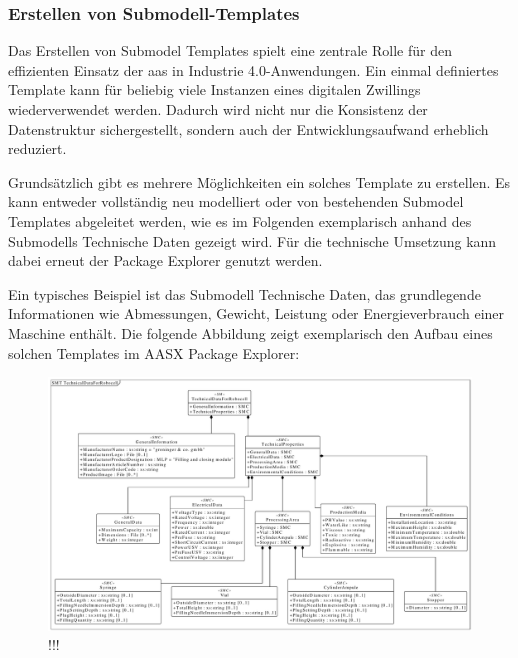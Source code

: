 \subsubsection{Erstellen von Submodell-Templates}
Das Erstellen von Submodel Templates spielt eine zentrale Rolle für den effizienten Einsatz der \acs{aas} in Industrie 4.0-Anwendungen. 
Ein einmal definiertes Template kann für beliebig viele Instanzen eines digitalen Zwillings wiederverwendet werden. 
Dadurch wird nicht nur die Konsistenz der Datenstruktur sichergestellt, sondern auch der Entwicklungsaufwand erheblich reduziert.

Grundsätzlich gibt es mehrere Möglichkeiten ein solches Template zu erstellen.
Es kann entweder vollständig neu modelliert oder von bestehenden Submodel Templates abgeleitet werden, wie es im Folgenden exemplarisch anhand des Submodells Technische Daten \cite{SpezifikaitonTechnischeDaten} gezeigt wird.
Für die technische Umsetzung kann dabei erneut der Package Explorer genutzt werden.

Ein typisches Beispiel ist das Submodell Technische Daten, das grundlegende Informationen wie Abmessungen, Gewicht, Leistung oder Energieverbrauch einer Maschine enthält. Die folgende Abbildung zeigt exemplarisch den Aufbau eines solchen Templates im AASX Package Explorer:




\begin{figure}[htbp]
    \centering
    \includegraphics[width=1\textwidth]{Bilder/UML/tehcnicalDataForRobocell.pdf}
    \caption{!!!}
    \label{fig:!!!}
\end{figure}


